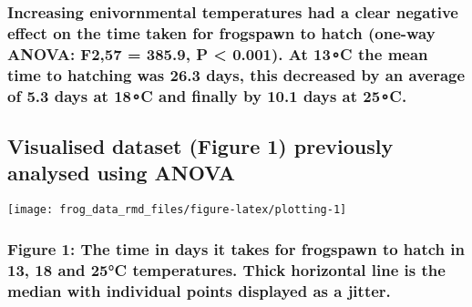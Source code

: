 \documentclass[
]{article}
\begin{document}
\hypertarget{increasing-enivornmental-temperatures-had-a-clear-negative-effect-on-the-time-taken-for-frogspawn-to-hatch-one-way-anova-f257-385.9-p-0.001.-at-13c-the-mean-time-to-hatching-was-26.3-days-this-decreased-by-an-average-of-5.3-days-at-18c-and-finally-by-10.1-days-at-25c.}{%
\subsubsection{Increasing enivornmental temperatures had a clear
negative effect on the time taken for frogspawn to hatch (one-way ANOVA:
F2,57 = 385.9, P \textless{} 0.001). At 13∘C the mean time to hatching
was 26.3 days, this decreased by an average of 5.3 days at 18∘C and
finally by 10.1 days at
25∘C.}\label{increasing-enivornmental-temperatures-had-a-clear-negative-effect-on-the-time-taken-for-frogspawn-to-hatch-one-way-anova-f257-385.9-p-0.001.-at-13c-the-mean-time-to-hatching-was-26.3-days-this-decreased-by-an-average-of-5.3-days-at-18c-and-finally-by-10.1-days-at-25c.}}

\hypertarget{visualised-dataset-figure-1-previously-analysed-using-anova}{%
\subsection{Visualised dataset (Figure 1) previously analysed using
ANOVA}\label{visualised-dataset-figure-1-previously-analysed-using-anova}}

\begin{center}\texttt{[image: frog\_data\_rmd\_files/figure-latex/plotting-1]} \end{center}

\hypertarget{figure-1-the-time-in-days-it-takes-for-frogspawn-to-hatch-in-13-18-and-25c-temperatures.-thick-horizontal-line-is-the-median-with-individual-points-displayed-as-a-jitter.}{%
\subsubsection{Figure 1: The time in days it takes for frogspawn to
hatch in 13, 18 and 25°C temperatures. Thick horizontal line is the
median with individual points displayed as a
jitter.}\label{figure-1-the-time-in-days-it-takes-for-frogspawn-to-hatch-in-13-18-and-25c-temperatures.-thick-horizontal-line-is-the-median-with-individual-points-displayed-as-a-jitter.}}
\end{document}
